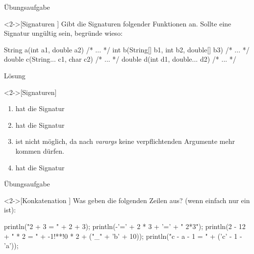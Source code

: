 \begin{frame}[c,fragile]{Übungsaufgabe}
    \begin{exercise}<2->[Signaturen ]
        \pause{}Gibt die Signaturen folgender Funktionen an.\pause{} Sollte eine Signatur ungültig sein, begründe wieso:\pause{}
        \begin{plainvoid}
String a(int a1, double a2) { /* ... */ }
int b(String[] b1, int b2, double[] b3) { /* ... */ }
double c(String... c1, char c2) { /* ... */ }
double d(int d1, double... d2) { /* ... */ }
        \end{plainvoid}
    \end{exercise}
\end{frame}

\begin{frame}[c]{Lösung}
    \begin{solve}<2->[Signaturen]
        \begin{enumerate}[<+(1)->]
            \item {} hat die Signatur 
            \item {} hat die Signatur 
            \item {} ist nicht möglich,\pause{} da nach \emph{varargs} keine verpflichtenden Argumente mehr kommen dürfen.
            \item {} hat die Signatur 
        \end{enumerate}
    \end{solve}
\end{frame}


\begin{frame}[c,fragile]{Übungsaufgabe}
    \begin{exercise}<2->[Konkatenation ]
        \pause{}Was geben die folgenden Zeilen aus? (wenn  einfach nur ein  ist):\pause{}
        \begin{plainjava}
println("2 + 3 = " + 2 + 3);
println(-'=' + 2 * 3 + '=' + " 2*3");
println(2 - 12 + " * 2 = " + -1!**!0 * 2 + ("_" + 'b' + 10));
println("c - a - 1 = " + ('c' - 1 - 'a'));
        \end{plainjava}
    \end{exercise}
\end{frame}

